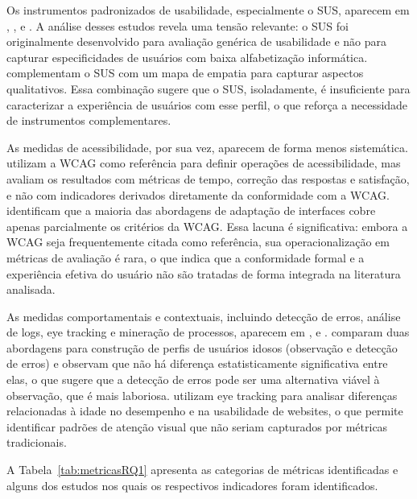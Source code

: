 Os instrumentos padronizados de usabilidade, especialmente o SUS, aparecem em \cite{weighted_heuristic}, \cite{allah2021empathy}, \cite{nosseir2011novice} e \cite{crabb2014age}. A análise desses estudos revela uma tensão relevante: o SUS foi originalmente desenvolvido para avaliação genérica de usabilidade e não para capturar especificidades de usuários com baixa alfabetização informática. \cite{allah2021empathy} complementam o SUS com um mapa de empatia para capturar aspectos qualitativos. Essa combinação sugere que o SUS, isoladamente, é insuficiente para caracterizar a experiência de usuários com esse perfil, o que reforça a necessidade de instrumentos complementares.

As medidas de acessibilidade, por sua vez, aparecem de forma menos sistemática. \cite{gonzalez2025augmenting} utilizam a WCAG como referência para definir operações de acessibilidade, mas avaliam os resultados com métricas de tempo, correção das respostas e satisfação, e não com indicadores derivados diretamente da conformidade com a WCAG. \cite{wickramathilaka2023addressing} identificam que a maioria das abordagens de adaptação de interfaces cobre apenas parcialmente os critérios da WCAG. Essa lacuna é significativa: embora a WCAG seja frequentemente citada como referência, sua operacionalização em métricas de avaliação é rara, o que indica que a conformidade formal e a experiência efetiva do usuário não são tratadas de forma integrada na literatura analisada.

As medidas comportamentais e contextuais, incluindo detecção de erros, análise de logs, eye tracking e mineração de processos, aparecem em \cite{taylor2009using}, \cite{romano2013age} e \cite{filgueiras2009recoverability}. \cite{taylor2009using} comparam duas abordagens para construção de perfis de usuários idosos (observação e detecção de erros) e observam que não há diferença estatisticamente significativa entre elas, o que sugere que a detecção de erros pode ser uma alternativa viável à observação, que é mais laboriosa. \cite{romano2013age} utilizam eye tracking para analisar diferenças relacionadas à idade no desempenho e na usabilidade de websites, o que permite identificar padrões de atenção visual que não seriam capturados por métricas tradicionais.

A Tabela~\ref{tab:metricasRQ1} apresenta as categorias de métricas identificadas e alguns dos estudos nos quais os respectivos indicadores foram identificados.



